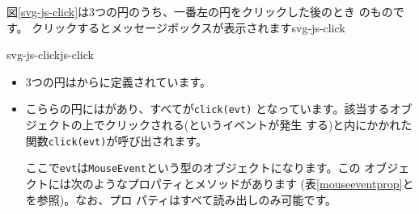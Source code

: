 図\ref{svg-js-click}は3つの円のうち、一番左の円をクリックした後のとき
のものです。
{クリックするとメッセージボックスが表示されます}{svg-js-click}

    {svg-js-click}{js-click}
\begin{itemize}
 \item 3つの円はからに定義されています。
 \item こららの円にはがあり、すべてが\texttt{click(evt)}
 となっています。該当するオブジェクトの上でクリックされる(というイベントが発生
 する)と\JS 内にかかれた関数\texttt{click(evt)}が呼び出されます。

ここで\texttt{evt}は\texttt{MouseEvent}という型のオブジェクトになります。この
オブジェクトには次のようなプロパティとメソッドがあります
(表\ref{mouseeventprop}と\cite[AppendixC]{DOM2Event}を参照)。なお、プロ
       パティはすべて読み出しのみ可能です。


\end{itemize}
